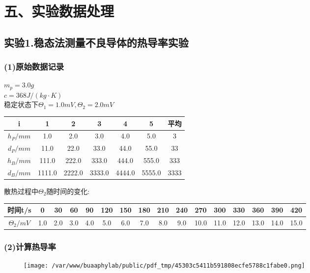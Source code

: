 \documentclass[11pt,a4paper,oneside]{article}
\begin{document}
\section*{五、实验数据处理}
\subsection*{实验1.稳态法测量不良导体的热导率实验}
\subsubsection*{(1)原始数据记录}

\noindent
$m_p = 3.0g$ \\
$c = 368 J/(kg\cdot K)$ \\ 
稳定状态下$\displaystyle \Theta_1 = 1.0mV, \Theta_2 = 2.0mV$ \\
\begin{center}
\begin{tabular}{|c|c|c|c|c|c|c|}
\hline
i & 1 &2 &3 &4 &5 & 平均 \\
\hline
$h_P/mm$ & 1.0 &2.0 &3.0 &4.0 &5.0 & 3 \\
\hline
$d_P/mm$ & 11.0 &22.0 &33.0 &44.0 &55.0 & 33 \\
\hline
$h_B/mm$ & 111.0 &222.0 &333.0 &444.0 &555.0 & 333 \\
\hline
$d_B/mm$ & 1111.0 &2222.0 &3333.0 &4444.0 &5555.0 & 3333 \\
\hline
\end{tabular} 
\end{center}

散热过程中$\Theta_2$随时间的变化:

\begin{center}
\begin{tabular}{|c|c|c|c|c|c|c|c|c|c|c|c|c|c|c|c|}
\hline
时间t/s & 0& 30& 60& 90& 120& 150& 180& 210& 240& 270& 300& 330& 360& 390& 420 \\
\hline
$\Theta_2/mV$ & 1.0& 2.0& 3.0& 4.0& 5.0& 6.0& 7.0& 8.0& 9.0& 10.0& 11.0& 12.0& 13.0& 14.0& 15.0 \\
\hline
\end{tabular} 
\end{center}

\subsubsection*{(2)计算热导率}
\noindent
\begin{figure}[H]
 \centering
  \texttt{[image: /var/www/buaaphylab/public/pdf\_tmp/45303c5411b591808ecfe5788c1fabe0.png]}
\end{figure}
\end{document}
